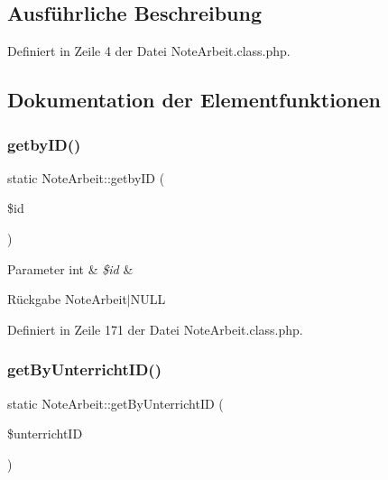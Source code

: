 \subsection{Ausführliche Beschreibung}


Definiert in Zeile 4 der Datei Note\+Arbeit.\+class.\+php.



\subsection{Dokumentation der Elementfunktionen}
\mbox{\label{class_note_arbeit_a6f8d348f0e7a13abc8b30d9c79f3422a}} 
\subsubsection{\texorpdfstring{getby\+I\+D()}{getbyID()}}
{\footnotesize\ttfamily static Note\+Arbeit\+::getby\+ID (\begin{DoxyParamCaption}\item[{}]{\$id }\end{DoxyParamCaption})\hspace{0.3cm}{\ttfamily [static]}}


\begin{DoxyParams}[1]{Parameter}
int & {\em \$id} & \\
\hline
\end{DoxyParams}
\begin{DoxyReturn}{Rückgabe}
Note\+Arbeit$\vert$\+N\+U\+LL 
\end{DoxyReturn}


Definiert in Zeile 171 der Datei Note\+Arbeit.\+class.\+php.

\mbox{\label{class_note_arbeit_a592f3057d39d92ffc02791881b2d87f8}} 
\subsubsection{\texorpdfstring{get\+By\+Unterricht\+I\+D()}{getByUnterrichtID()}}
{\footnotesize\ttfamily static Note\+Arbeit\+::get\+By\+Unterricht\+ID (\begin{DoxyParamCaption}\item[{}]{\$unterricht\+ID }\end{DoxyParamCaption})\hspace{0.3cm}{\ttfamily [static]}}


